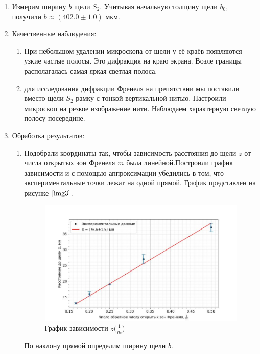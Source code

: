 \documentclass[a4paper,12pt]{article} %
\begin{document}
\begin{enumerate}
    \item Измерим ширину $b$ щели $S_2$. Учитывая начальную толщину щели $b_0$, получили $b\approx(402.0\pm1.0)\text{ мкм}.$
    \item Качественные наблюдения:
    \begin{enumerate}
        \item При небольшом удалении микроскопа от щели у её краёв появляются узкие частые полосы. Это $\text{дифракция на краю экрана}$. Возле границы располагалась самая яркая светлая полоса.
        \item для исследования $\text{дифракции Френеля на препятствии}$ мы поставили вместо щели $S_2$ рамку с тонкой вертикальной нитью. Настроили микроскоп на резкое изображение нити. Наблюдаем характерную светлую полосу посередине.
    \end{enumerate}
    \item Обработка результатов:
    \begin{enumerate}
        \item Подобрали координаты так, чтобы зависимость расстояния до щели $z$ от числа открытых зон Френеля $m$ была линейной.Построили график зависимости и с помощью аппроксимации убедились в том, что экспериментальные точки лежат на одной прямой. График представлен на рисунке $\ref{img3}$.
    
    \begin{figure}[h]
    \begin{center}
        \includegraphics[width=16cm]{image3.jpg}
    \end{center}
        \caption{График зависимости $z\big(\frac{1}{m}\big)$}
        \label{img3}
    \end{figure}

    По наклону прямой определим ширину щели $b$.


\end{enumerate}
\end{enumerate}
\end{document}
